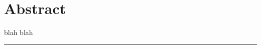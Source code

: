 \documentclass[10pt]{article}
\begin{document}

\begin{center}
{\Large\doctitle}
\end{center}
\vspace{1ex}
\begin{center}
{\docauthor}
\end{center}

\section*{Abstract}

blah blah

\vspace{4ex}
\hrule












\end{document}
